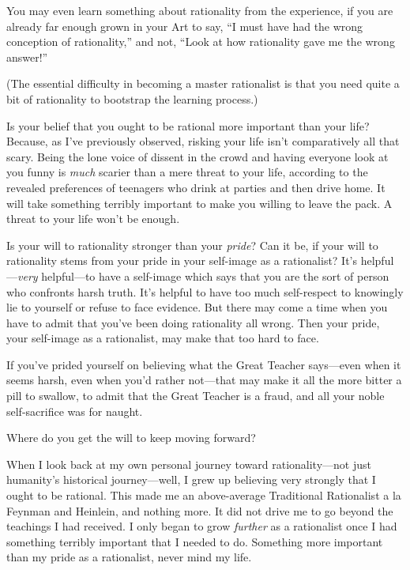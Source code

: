 {
 You may even learn something about rationality from the
experience, if you are already far enough grown in your Art to say,
``I must have had the wrong conception of
rationality,'' and not, ``Look at
how rationality gave me the wrong answer!''}

{
 (The essential difficulty in becoming a master rationalist is that
you need quite a bit of rationality to bootstrap the learning
process.)}

{
 Is your belief that you ought to be rational more important than
your life? Because, as I've previously observed,
risking your life isn't comparatively all that scary.
Being the lone voice of dissent in the crowd and having everyone look
at you funny is \textit{much} scarier than a mere threat to your life,
according to the revealed preferences of teenagers who drink at parties
and then drive home. It will take something terribly important to make
you willing to leave the pack. A threat to your life
won't be enough.}

{
 Is your will to rationality stronger than your \textit{pride}? Can
it be, if your will to rationality stems from your pride in your
self-image as a rationalist? It's
helpful---\textit{very} helpful---to have a self-image which says that
you are the sort of person who confronts harsh truth.
It's helpful to have too much self-respect to knowingly
lie to yourself or refuse to face evidence. But there may come a time
when you have to admit that you've been doing
rationality all wrong. Then your pride, your self-image as a
rationalist, may make that too hard to face.}

{
 If you've prided yourself on believing what the
Great Teacher says---even when it seems harsh, even when
you'd rather not---that may make it all the more bitter
a pill to swallow, to admit that the Great Teacher is a fraud, and all
your noble self-sacrifice was for naught.}

{
 Where do you get the will to keep moving forward?}

{
 When I look back at my own personal journey toward
rationality---not just humanity's historical
journey---well, I grew up believing very strongly that I ought to be
rational. This made me an above-average Traditional Rationalist a la
Feynman and Heinlein, and nothing more. It did not drive me to go
beyond the teachings I had received. I only began to grow
\textit{further} as a rationalist once I had something terribly
important that I needed to do. Something more important than my pride
as a rationalist, never mind my life.}

